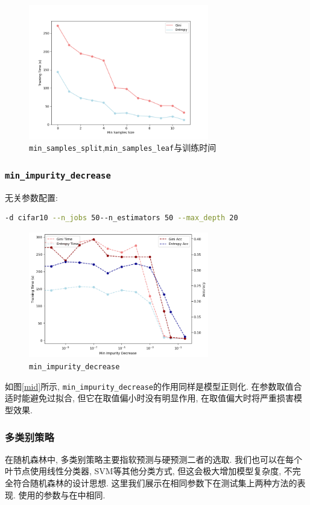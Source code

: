 \documentclass[a4paper]{article}
\begin{document}
\begin{figure}[h]
    \centering
    \includegraphics[width=0.7\textwidth,height=0.4\textwidth]{figs/4.png}
    
    \caption{\texttt{min\_samples\_split},\texttt{min\_samples\_leaf}与训练时间}
    \label{fig:samples_time}
\end{figure}

\subsubsection{\texttt{min\_impurity\_decrease}}
无关参数配置:
 \begin{lstlisting}[language=bash]
-d cifar10 --n_jobs 50--n_estimators 50 --max_depth 20 
\end{lstlisting}

\begin{figure}[h]
    \centering
    \includegraphics[width=0.7\textwidth,height=0.4\textwidth]{figs/5.png}
    
    \caption{\texttt{min\_impurity\_decrease}}
    \label{fig:mid}
\end{figure}

如图\ref{mid}所示, \texttt{min\_impurity\_decrease}的作用同样是模型正则化. 在参数取值合适时能避免过拟合, 但它在取值偏小时没有明显作用, 在取值偏大时将严重损害模型效果. 

\subsubsection{多类别策略} \label{sec:multiclass}
在随机森林中, 多类别策略主要指软预测与硬预测二者的选取. 我们也可以在每个叶节点使用线性分类器, SVM等其他分类方式, 但这会极大增加模型复杂度, 不完全符合随机森林的设计思想. 这里我们展示在相同参数下在测试集上两种方法的表现. 使用的参数与在\label{sec:best_rf}中相同.
\end{document}
